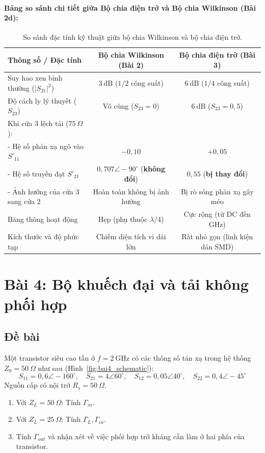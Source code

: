 \documentclass[12pt,a4paper]{article}
\begin{document}
\paragraph{Bảng so sánh chi tiết giữa Bộ chia điện trở và Bộ chia Wilkinson (Bài 2d):}
\begin{table}[H]
\centering
\begin{tabular}{lcc}
\toprule
\textbf{Thông số / Đặc tính} & \textbf{Bộ chia Wilkinson (Bài 2)} & \textbf{Bộ chia điện trở (Bài 3)} \\
\midrule
Suy hao xen bình thường ($|S_{21}|^2$) & $3~\text{dB}$ ($1/2$ công suất) & $6~\text{dB}$ ($1/4$ công suất) \\
Độ cách ly lý thuyết ($S_{23}$) & Vô cùng ($S_{23} = 0$) & $6~\text{dB}$ ($S_{23} = 0{,}5$) \\
Khi cửa 3 lệch tải ($75~\Omega$): & & \\
- Hệ số phản xạ ngõ vào $S'_{11}$ & $-0{,}10$ & $+0{,}05$ \\
- Hệ số truyền đạt $S'_{21}$ & $0{,}707 \angle -90^\circ$ (\textbf{không đổi}) & $0{,}55$ (\textbf{bị thay đổi}) \\
- Ảnh hưởng của cửa 3 sang cửa 2 & Hoàn toàn không bị ảnh hưởng & Bị rò sóng phản xạ gây méo \\
Băng thông hoạt động & Hẹp (phụ thuộc $\lambda/4$) & Cực rộng (từ DC đến GHz) \\
Kích thước và độ phức tạp & Chiếm diện tích vi dải lớn & Rất nhỏ gọn (linh kiện dán SMD) \\
\bottomrule
\end{tabular}
\caption{So sánh đặc tính kỹ thuật giữa bộ chia Wilkinson và bộ chia điện trở.}
\end{table}

\newpage

\section{Bài 4: Bộ khuếch đại và tải không phối hợp}

\subsection{Đề bài}
Một transistor siêu cao tần ở $f = 2~\text{GHz}$ có các thông số tán xạ trong hệ thống $Z_0 = 50~\Omega$ như sau (Hình~\ref{fig:bai4_schematic}):
\[
S_{11} = 0{,}6 \angle -160^\circ, \quad S_{21} = 4 \angle 60^\circ, \quad S_{12} = 0{,}05 \angle 40^\circ, \quad S_{22} = 0{,}4 \angle -45^\circ
\]
Nguồn cấp có nội trở $R_s = 50~\Omega$.
\begin{enumerate}
    \item[(a)] Với $Z_L = 50~\Omega$: Tính $\Gamma_{in}$.
    \item[(b)] Với $Z_L = 25~\Omega$: Tính $\Gamma_L, \Gamma_{in}$.
    \item[(c)] Tính $\Gamma_{out}$ và nhận xét về việc phối hợp trở kháng cần làm ở hai phía của transistor.
\end{enumerate}
\end{document}
